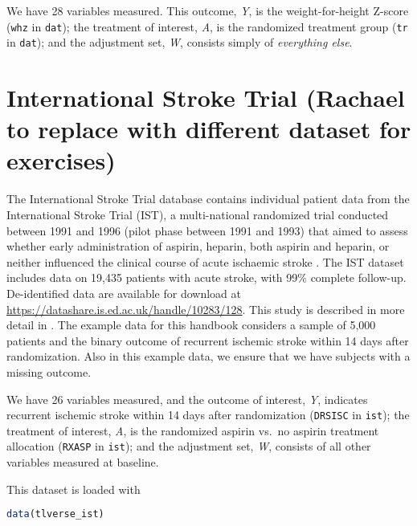\documentclass[
  12pt, krantz2,
]{krantz}
\newcommand{\passthrough}[1]{#1}
\theoremstyle{definition}
\theoremstyle{definition}
\theoremstyle{definition}
\newcommand{\1}{\mathbbm{1}}
\begin{document}
We have 28 variables measured. This outcome, \emph{Y}, is the weight-for-height Z-score (\passthrough{\lstinline!whz!} in \passthrough{\lstinline!dat!}); the treatment of interest, \emph{A}, is the randomized treatment group (\passthrough{\lstinline!tr!} in \passthrough{\lstinline!dat!}); and the adjustment set, \emph{W}, consists simply of \emph{everything else}.

\hypertarget{international-stroke-trial-rachael-to-replace-with-different-dataset-for-exercises}{%
\section{International Stroke Trial (Rachael to replace with different dataset for exercises)}\label{international-stroke-trial-rachael-to-replace-with-different-dataset-for-exercises}}

The International Stroke Trial database contains individual patient data from the International Stroke Trial (IST), a multi-national randomized trial conducted between 1991 and 1996 (pilot phase between 1991 and 1993) that aimed to assess whether early administration of aspirin, heparin, both aspirin and heparin, or neither influenced the clinical course of acute ischaemic stroke \citep{sandercock1997international}. The IST dataset includes data on 19,435 patients with acute stroke, with 99\% complete follow-up. De-identified data are available for download at \url{https://datashare.is.ed.ac.uk/handle/10283/128}. This study is described in more detail in \citet{sandercock2011international}. The example data for this handbook considers a sample of 5,000 patients and the binary outcome of recurrent ischemic stroke within 14 days after randomization. Also in this example data, we ensure that we have subjects with a missing outcome.

We have 26 variables measured, and the outcome of interest, \emph{Y}, indicates recurrent ischemic stroke within 14 days after randomization (\passthrough{\lstinline!DRSISC!} in \passthrough{\lstinline!ist!}); the treatment of interest, \emph{A}, is the randomized aspirin vs.~no aspirin treatment allocation (\passthrough{\lstinline!RXASP!} in \passthrough{\lstinline!ist!}); and the adjustment set, \emph{W}, consists of all other variables measured at baseline.

This dataset is loaded with

\begin{lstlisting}[language=R]
data(tlverse_ist)
\end{lstlisting}
\end{document}
